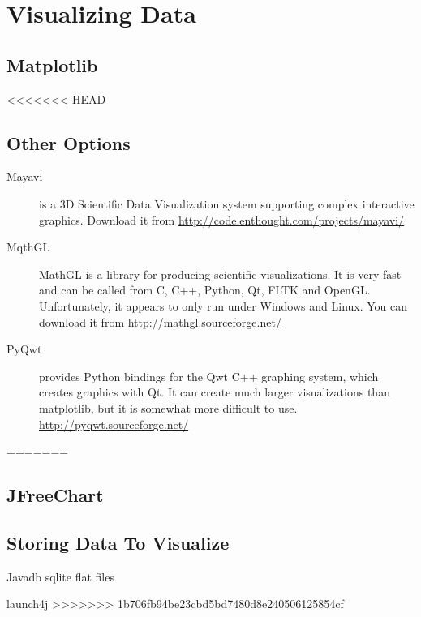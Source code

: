 \chapter{Visualizing Data}
\section{Matplotlib}
<<<<<<< HEAD
\section{Other Options}
\begin{description}
\item[Mayavi] is a 3D Scientific Data Visualization system supporting
  complex interactive graphics. Download it from \url{http://code.enthought.com/projects/mayavi/}
\item[MqthGL] MathGL is a library for producing scientific
  visualizations. It is very fast and can be called from C, C++,
  Python, Qt, FLTK and OpenGL. Unfortunately, it appears to only run
  under Windows and Linux. You can download it from \url{http://mathgl.sourceforge.net/}
\item[PyQwt] provides Python bindings for the Qwt C++ graphing system,
  which creates graphics with Qt. It can create much larger
  visualizations than matplotlib, but it is somewhat more difficult to
  use. \url{http://pyqwt.sourceforge.net/}
\end{description}
=======
\section{JFreeChart}
\section{Storing Data To Visualize}
Javadb
sqlite
flat files

launch4j
>>>>>>> 1b706fb94be23cbd5bd7480d8e240506125854cf
